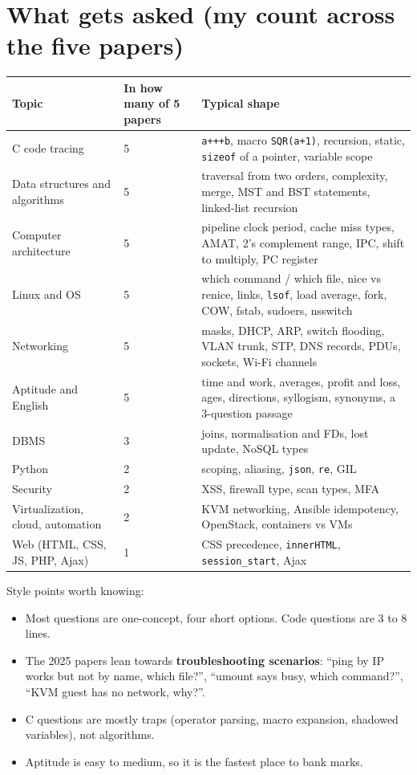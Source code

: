 \documentclass[11pt,a4paper]{article}
\begin{document}
\section*{What gets asked (my count across the five papers)}
\begin{center}\small\renewcommand{\arraystretch}{1.18}\setlength{\tabcolsep}{9pt}
\begin{tabularx}{\linewidth}{@{}>{\raggedright\arraybackslash}Xl>{\raggedright\arraybackslash}X@{}}
\toprule
\textbf{\color{slate}Topic} & \textbf{\color{slate}In how many of 5 papers} & \textbf{\color{slate}Typical shape} \\ \midrule
C code tracing & 5 & \texttt{a+++b}, macro \texttt{SQR(a+1)}, recursion, static, \texttt{sizeof} of a pointer, variable scope \\
Data structures and algorithms & 5 & traversal from two orders, complexity, merge, MST and BST statements, linked-list recursion \\
Computer architecture & 5 & pipeline clock period, cache miss types, AMAT, 2's complement range, IPC, shift to multiply, PC register \\
Linux and OS & 5 & which command / which file, nice vs renice, links, \texttt{lsof}, load average, fork, COW, fstab, sudoers, nsswitch \\
Networking & 5 & masks, DHCP, ARP, switch flooding, VLAN trunk, STP, DNS records, PDUs, sockets, Wi-Fi channels \\
Aptitude and English & 5 & time and work, averages, profit and loss, ages, directions, syllogism, synonyms, a 3-question passage \\
DBMS & 3 & joins, normalisation and FDs, lost update, NoSQL types \\
Python & 2 & scoping, aliasing, \texttt{json}, \texttt{re}, GIL \\
Security & 2 & XSS, firewall type, scan types, MFA \\
Virtualization, cloud, automation & 2 & KVM networking, Ansible idempotency, OpenStack, containers vs VMs \\
Web (HTML, CSS, JS, PHP, Ajax) & 1 & CSS precedence, \texttt{innerHTML}, \texttt{session\_start}, Ajax \\
\bottomrule
\end{tabularx}\end{center}
Style points worth knowing:

\begin{itemize}
\item Most questions are one-concept, four short options. Code questions are 3 to 8 lines.
\item The 2025 papers lean towards \textbf{troubleshooting scenarios}: ``ping by IP works but not by name, which file?'', ``umount says busy, which command?'', ``KVM guest has no network, why?''.
\item C questions are mostly traps (operator parsing, macro expansion, shadowed variables), not algorithms.
\item Aptitude is easy to medium, so it is the fastest place to bank marks.
\end{itemize}
\end{document}
